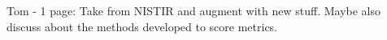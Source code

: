 Tom - 1 page: Take from NISTIR and augment with new stuff. Maybe also discuss about the methods developed to score metrics. 